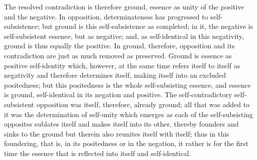 The resolved contradiction is therefore ground,
essence as unity of the positive and the negative.
In opposition, determinateness has progressed to self-subsistence;
but ground is this self-subsistence as completed;
in it, the negative is self-subsistent essence, but as negative;
and, as self-identical in this negativity,
ground is thus equally the positive.
In ground, therefore, opposition and its contradiction are
just as much removed as preserved.
Ground is essence as positive self-identity
which, however, at the same time
refers itself to itself as negativity
and therefore determines itself,
making itself into an excluded positedness;
but this positedness is the whole self-subsisting essence,
and essence is ground, self-identical in its negation and positive.
The self-contradictory self-subsistent opposition was itself,
therefore, already ground;
all that was added to it was the determination of self-unity
which emerges as each of the self-subsisting opposites
sublates itself and makes itself into its other,
thereby founders and sinks to the ground
but therein also reunites itself with itself;
thus in this foundering, that is, in its positedness or in the negation,
it rather is for the first time the essence
that is reflected into itself and self-identical.
